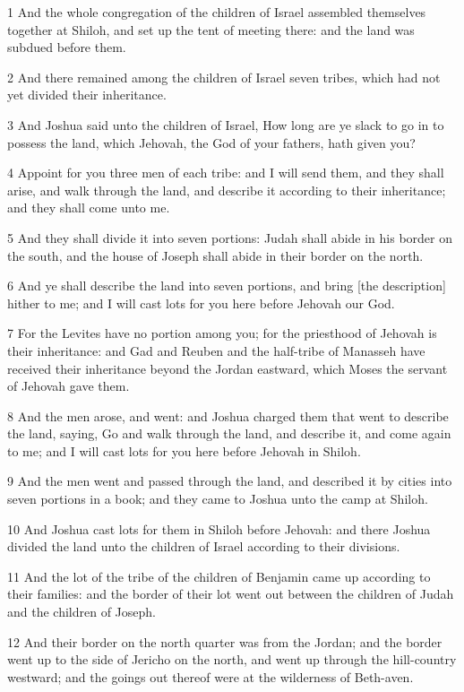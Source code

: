 \par 1 And the whole congregation of the children of Israel assembled themselves together at Shiloh, and set up the tent of meeting there: and the land was subdued before them.
\par 2 And there remained among the children of Israel seven tribes, which had not yet divided their inheritance.
\par 3 And Joshua said unto the children of Israel, How long are ye slack to go in to possess the land, which Jehovah, the God of your fathers, hath given you?
\par 4 Appoint for you three men of each tribe: and I will send them, and they shall arise, and walk through the land, and describe it according to their inheritance; and they shall come unto me.
\par 5 And they shall divide it into seven portions: Judah shall abide in his border on the south, and the house of Joseph shall abide in their border on the north.
\par 6 And ye shall describe the land into seven portions, and bring [the description] hither to me; and I will cast lots for you here before Jehovah our God.
\par 7 For the Levites have no portion among you; for the priesthood of Jehovah is their inheritance: and Gad and Reuben and the half-tribe of Manasseh have received their inheritance beyond the Jordan eastward, which Moses the servant of Jehovah gave them.
\par 8 And the men arose, and went: and Joshua charged them that went to describe the land, saying, Go and walk through the land, and describe it, and come again to me; and I will cast lots for you here before Jehovah in Shiloh.
\par 9 And the men went and passed through the land, and described it by cities into seven portions in a book; and they came to Joshua unto the camp at Shiloh.
\par 10 And Joshua cast lots for them in Shiloh before Jehovah: and there Joshua divided the land unto the children of Israel according to their divisions.
\par 11 And the lot of the tribe of the children of Benjamin came up according to their families: and the border of their lot went out between the children of Judah and the children of Joseph.
\par 12 And their border on the north quarter was from the Jordan; and the border went up to the side of Jericho on the north, and went up through the hill-country westward; and the goings out thereof were at the wilderness of Beth-aven.
